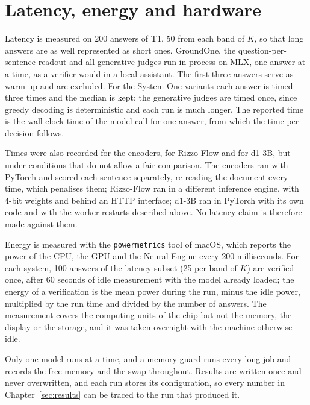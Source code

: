 \section{Latency, energy and hardware}
\label{sec:setup-protocol}

Latency is measured on 200 answers of T1, 50 from each band of $K$, so that long answers are as well represented as
short ones. GroundOne, the question-per-sentence readout and all generative judges run in process on MLX, one answer at a
time, as a verifier would in a local assistant. The first three answers serve as warm-up and are excluded. For the
System One variants each answer is timed three times and the median is kept; the generative judges are timed once,
since greedy decoding is deterministic and each run is much longer. The reported time is the wall-clock time of the
model call for one answer, from which the time per decision follows.

Times were also recorded for the encoders, for Rizzo-Flow and for d1-3B, but under conditions that do not allow a fair
comparison. The encoders ran with PyTorch and scored each sentence separately, re-reading the document every time, which
penalises them; Rizzo-Flow ran in a different inference engine, with 4-bit weights and behind an HTTP interface; d1-3B ran
in PyTorch with its own code and with the worker restarts described above. No latency claim is therefore made against
them.

Energy is measured with the \texttt{powermetrics} tool of macOS, which reports the power of the CPU, the GPU and the
Neural Engine every 200 milliseconds. For each system, 100 answers of the latency subset (25 per band of $K$) are
verified once, after 60 seconds of idle measurement with the model already loaded; the energy of a verification is the
mean power during the run, minus the idle power, multiplied by the run time and divided by the number of answers. The
measurement covers the computing units of the chip but not the memory, the display or the storage, and it was taken
overnight with the machine otherwise idle.

Only one model runs at a time, and a memory guard runs every long job and records the free memory and the swap
throughout. Results are written once and never overwritten, and each run stores its configuration, so every number in
Chapter~\ref{sec:results} can be traced to the run that produced it.
